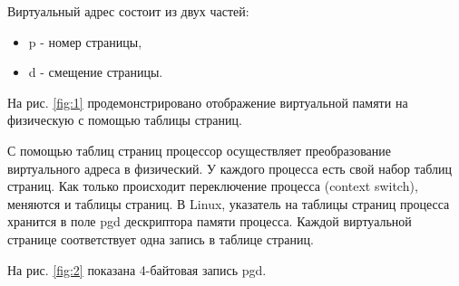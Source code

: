 Виртуальный адрес состоит из двух частей:

\begin{itemize}
	\item p - номер страницы,
	\item d - смещение страницы.
\end{itemize}

На рис. \ref{fig:1} продемонстрировано отображение виртуальной памяти на физическую с помощью таблицы страниц.

\begin{figure}[ht!]
\end{figure}


С помощью таблиц страниц процессор осуществляет 
преобразование виртуального адреса в физический. 
У каждого процесса есть свой набор таблиц страниц.
Как только происходит переключение процесса (context switch), меняются и таблицы страниц. 
В Linux, указатель на таблицы страниц процесса хранится в поле pgd дескриптора памяти процесса. 
Каждой виртуальной странице соответствует одна запись в таблице страниц.

На рис. \ref{fig:2} показана 4-байтовая запись pgd.

\begin{figure}[ht!]
\end{figure}

